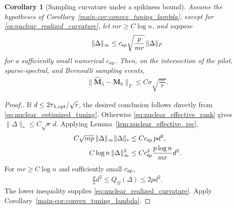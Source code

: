 \documentclass[numsec,webpdf,modern,large,namedate]{oup-authoring-template}
\theoremstyle{plain}
\newtheorem{scorollary}{Corollary}%
\theoremstyle{remark}
\newcommand{\M}{\bm{M}}
\newif\ifmarkchanges
\newenvironment{revision}{\begingroup\ifmarkchanges\color{red}\fi}{\endgroup}
\begin{document}
\begin{revision}
\begin{scorollary}[Sampling curvature under a spikiness bound]
\label{cor:nuclear_geometric_certificate}
Assume the hypotheses of Corollary~\ref{main-cor:convex_tuning_lambda},
except for
\eqref{eq:nuclear_realized_curvature}, let $mr\ge C\log n$, and suppose
\begin{align}
\label{eq:nuclear_spikiness_localization}
 \|\Delta\|_\infty
 \le
 c_{\rm sp}
 \sqrt{\frac{p}{mr}}\,
 \|\Delta\|_F
\end{align}
for a sufficiently small numerical $c_{\rm sp}$.  Then, on the intersection
of the pilot, sparse-spectral, and Bernoulli sampling events,
\begin{align}
\label{eq:nuclear_geometric_rate}
 \|\widehat{\M}_\lambda-\M_0\|_F
 \le
 C\sigma\sqrt{\frac{mr}{p}}.
\end{align}
\end{scorollary}
\begin{proof}[Proof.]
If
$d\le2\tau_{\lambda,\rm opt}/\sqrt r$, the desired conclusion follows
directly from \eqref{eq:nuclear_optimized_tuning}.  Otherwise
\eqref{eq:nuclear_effective_rank} gives
$\|\Delta\|_*\le C\sqrt r\,d$.  Applying
Lemma~\ref{lem:nuclear_effective_rsc},
\begin{align*}
 C\sqrt{mp}\,
 \|\Delta\|_\infty\|\Delta\|_*
 &\le
 Cc_{\rm sp}\,pd^2,\\
 C\log n\,\|\Delta\|_\infty^2
 &\le
 Cc_{\rm sp}^2
 \frac{p\log n}{mr}d^2.
\end{align*}
For $mr\ge C\log n$ and sufficiently small $c_{\rm sp}$,
\begin{align}
\label{eq:nuclear_curvature_from_spikiness}
 \frac p2d^2
 \le
 Q_\Omega(\Delta)
 \le
 2pd^2.
\end{align}
The lower inequality supplies
\eqref{eq:nuclear_realized_curvature}.  Apply
Corollary~\ref{main-cor:convex_tuning_lambda}.
\end{proof}
\end{revision}
\end{document}
